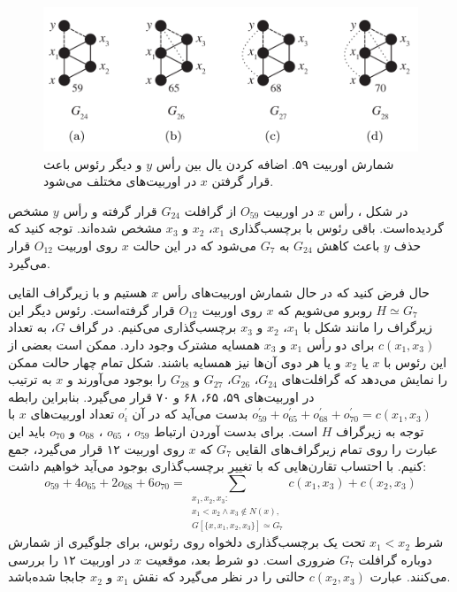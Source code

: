 \begin{figure}[t]
\centering
\includegraphics[scale=0.3]{./o59-orbit-relation.png}
\caption{شمارش اوربیت ۵۹. اضافه کردن یال بین رأس $y$ و دیگر رئوس باعث قرار گرفتن $x$ در اوربیت‌های مختلف می‌شود.}
\label{fig:o59-orbit-relation}
\end{figure}

در شکل ، رأس $x$ در اوربیت $O_{59}$ از گرافلت $G_{24}$ قرار گرفته و رأس $y$ مشخص گردیده‌است. باقی رئوس با برچسب‌گذاری $x_1$، $x_2$ و $x_3$ مشخص شده‌اند. توجه کنید که حذف $y$ باعث کاهش $G_{24}$ به $G_7$ می‌شود که در این حالت $x$ روی اوربیت $O_{12}$ قرار می‌گیرد.

حال فرض کنید که در حال شمارش اوربیت‌های رأس $x$ هستیم و با زیرگراف القایی $H \simeq G_{7}$ روبرو می‌شویم که $x$ روی اوربیت $O_{12}$ قرار گرفته‌است. رئوس دیگر این زیرگراف را مانند شکل با $x_1$، $x_2$ و $x_3$ برچسب‌گذاری می‌کنیم. در گراف $G$، به تعداد $c(x_1,x_3)$ برای دو رأس $x_1$ و $x_3$ همسایه مشترک وجود دارد. ممکن است بعضی از این رئوس با $x$ یا $x_2$ و یا هر دوی آن‌ها نیز همسایه باشند. شکل  تمام چهار حالت ممکن را نمایش می‌دهد که گرافلت‌های $G_{24}$، $G_{26}$، $G_{27}$ و $G_{28}$ را بوجود می‌آورند و $x$ به ترتیب در اوربیت‌های ۵۹، ۶۵، ۶۸ و ۷۰ قرار می‌گیرد. بنابراین رابطه $o^\prime_{59}+ o^\prime_{65}+o^\prime_{68}+o^\prime_{70} = c(x_1,x_3)$ بدست می‌آید که در آن $o^\prime_i$ تعداد اوربیت‌های $x$ با توجه به زیرگراف $H$ است. برای بدست آوردن ارتباط $o_{59}$ ،  $o_{65}$ ،  $o_{68}$ و  $o_{70}$ باید این عبارت را روی تمام زیرگراف‌های القایی $G_7$ که $x$ روی اوربیت ۱۲ قرار می‌گیرد، جمع کنیم. با احتساب تقارن‌هایی که با تغییر برچسب‌گذاری‌ بوجود می‌آید خواهیم داشت:
\begin{equation*}
o_{59}+4o_{65}+2o_{68}+6o_{70} = \sum_{\substack{x_1,x_2,x_3:\\x_1 < x_2\wedge x_3 \notin N(x),\\G[\{x,x_1,x_2,x_3\}]\simeq G_7}}{c(x_1,x_3)+c(x_2,x_3)}
\end{equation*}
شرط $x_1 < x_2$ تحت یک برچسب‌گذاری دلخواه روی رئوس، برای جلوگیری از شمارش دوباره گرافلت $G_7$ ضروری است. دو شرط بعد، موقعیت $x$ در اوربیت ۱۲ را بررسی می‌کنند. عبارت $c(x_2,x_3)$ حالتی را در نظر می‌گیرد که نقش $x_1$ و $x_2$ جابجا شده‌باشد.

